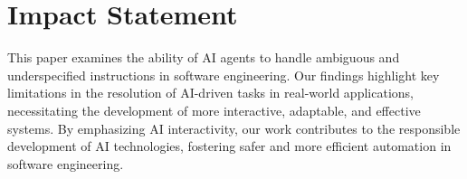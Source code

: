 \section*{Impact Statement}
This paper examines the ability of AI agents to handle ambiguous and underspecified instructions in software engineering. Our findings highlight key limitations in the resolution of AI-driven tasks in real-world applications, necessitating the development of more interactive, adaptable, and effective systems. By emphasizing AI interactivity, our work contributes to the responsible development of AI technologies, fostering safer and more efficient automation in software engineering.

